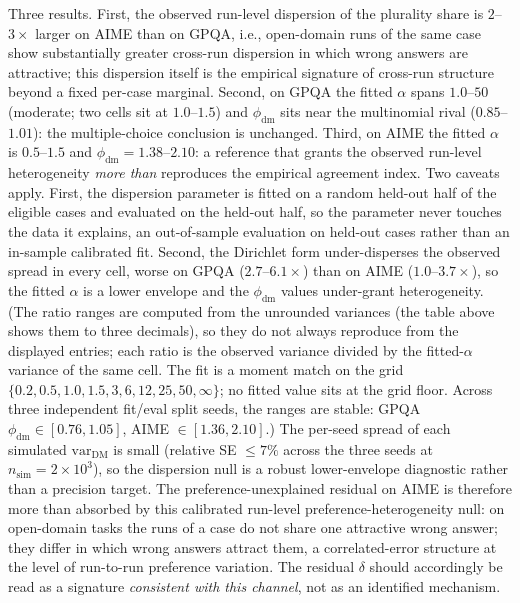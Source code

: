 \documentclass{article}
\begin{document}
Three results. First, the observed run-level dispersion of the plurality
share is $2$--$3\times$ larger on AIME than on GPQA, i.e., open-domain
runs of the same case show substantially greater cross-run dispersion in which wrong answers are
attractive; this dispersion itself is the empirical signature of
cross-run structure beyond a fixed per-case marginal. Second, on GPQA
the fitted $\alpha$ spans $1.0$--$50$ (moderate; two cells sit at $1.0$--$1.5$) and
$\phi_{\mathrm{dm}}$ sits near the multinomial rival
($0.85$--$1.01$): the multiple-choice conclusion is unchanged. Third,
on AIME the fitted $\alpha$ is $0.5$--$1.5$ and
$\phi_{\mathrm{dm}}=1.38$--$2.10$: a reference that grants the observed
run-level heterogeneity \emph{more than} reproduces the empirical
agreement index. Two caveats apply. First, the dispersion
parameter is fitted on a random held-out half of the eligible cases and
evaluated on the held-out half, so the parameter never touches the data
it explains, an out-of-sample evaluation on held-out cases rather than an in-sample calibrated fit.
Second, the Dirichlet form under-disperses the observed spread in every cell, worse on GPQA ($2.7$--$6.1\times$) than on AIME ($1.0$--$3.7\times$), so the fitted $\alpha$ is a lower envelope and the $\phi_{\mathrm{dm}}$ values under-grant heterogeneity. (The ratio ranges are computed from the unrounded variances (the table above shows them to three decimals), so they do not always reproduce from the displayed entries; each ratio is the observed variance divided by the fitted-$\alpha$ variance of the same cell. The fit is a moment match on the grid $\{0.2,0.5,1.0,1.5,3,6,12,25,50,\infty\}$; no fitted value sits at the grid floor. Across three independent fit/eval split seeds, the ranges are stable: GPQA $\phi_{\mathrm{dm}}\in[0.76,1.05]$, AIME $\in[1.36,2.10]$.) The per-seed spread of each simulated $\mathrm{var}_{\mathrm{DM}}$ is small (relative SE $\le7\%$ across the three seeds at $n_{\mathrm{sim}}=2\times10^3$), so the dispersion null is a robust lower-envelope diagnostic rather than a precision target.
The preference-unexplained
residual on AIME is therefore more than absorbed by this calibrated
run-level preference-heterogeneity null: on open-domain tasks the runs of a case do
not share one attractive wrong answer; they differ in which wrong
answers attract them, a correlated-error structure at the level of
run-to-run preference variation. The residual $\delta$ should
accordingly be read as a signature \emph{consistent with this channel},
not as an identified mechanism.
\end{document}
